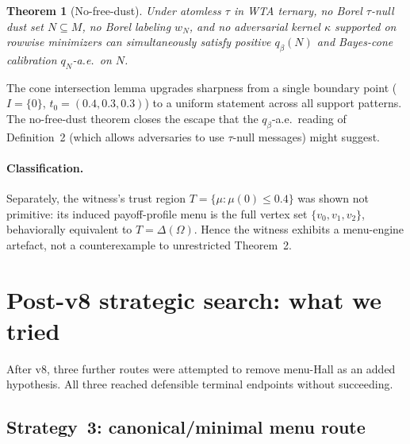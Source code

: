 \documentclass[11pt]{article}
\newtheorem{theorem}{Theorem}
\theoremstyle{definition}
\theoremstyle{remark}
\newcommand{\Om}{\Omega}
\begin{document}
\begin{theorem}[No-free-dust]
Under atomless $\tau$ in WTA ternary, no Borel $\tau$-null dust set
$N\subseteq M$, no Borel labeling $w_N$, and no adversarial kernel
$\kappa$ supported on rowwise minimizers can simultaneously satisfy
positive $q_\beta(N)$ and Bayes-cone calibration $q_N$-a.e.\ on $N$.
\end{theorem}

The cone intersection lemma upgrades sharpness from a single boundary
point ($I = \{0\}$, $t_0 = (0.4, 0.3, 0.3)$) to a uniform statement
across all support patterns. The no-free-dust theorem closes the
escape that the $q_\beta$-a.e.\ reading of Definition~2 (which allows
adversaries to use $\tau$-null messages) might suggest.

\paragraph{Classification.} Separately, the witness's trust region
$T = \{\mu : \mu(0)\le 0.4\}$ was shown not primitive: its induced
payoff-profile menu is the full vertex set $\{v_0, v_1, v_2\}$,
behaviorally equivalent to $T = \Delta(\Om)$. Hence the witness
exhibits a menu-engine artefact, not a counterexample to unrestricted
Theorem~2.

\section{Post-v8 strategic search: what we tried}\label{sec:routes}

After v8, three further routes were attempted to remove menu-Hall as
an added hypothesis. All three reached defensible terminal endpoints
without succeeding.

\subsection{Strategy~3: canonical/minimal menu route}\label{sec:strategy3}
\end{document}
